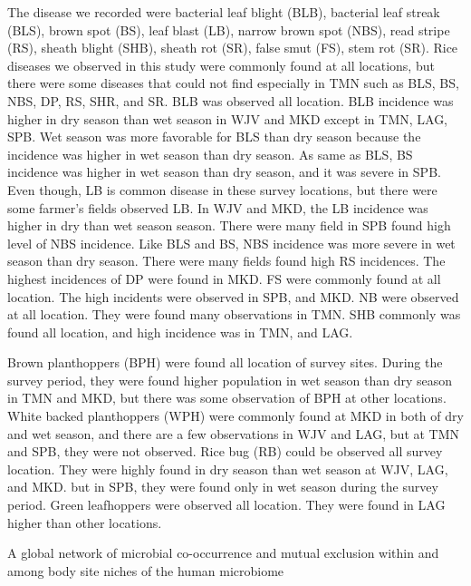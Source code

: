 The disease we recorded were bacterial leaf blight (BLB), bacterial leaf streak (BLS), brown spot (BS), leaf blast (LB), narrow brown spot (NBS), read stripe (RS), sheath blight (SHB), sheath rot (SR), false smut (FS), stem rot (SR). Rice diseases we observed in this study were commonly found at all locations, but there were some diseases that could not find especially in TMN such as BLS, BS, NBS, DP, RS, SHR, and SR. BLB was observed all location. BLB incidence was higher in dry season than wet season in WJV and MKD except in TMN, LAG, SPB. Wet season was more favorable for BLS than dry season because the incidence was higher in wet season than dry season. As same as BLS, BS incidence was higher in wet season than dry season, and it was severe in SPB. Even though, LB is common disease in these survey locations, but there were some farmer’s fields observed LB. In WJV and MKD, the LB incidence was higher in dry than wet season season. There were many field in SPB found high level of NBS incidence. Like BLS and BS, NBS incidence was more severe in wet season than dry season. There were many fields found high RS incidences. The highest incidences of DP were found in MKD. FS were commonly found at all location. The high incidents were observed in SPB, and MKD. NB were observed at all location. They were found many observations in TMN.  SHB commonly was found all location, and high incidence was in TMN, and LAG. 

Brown planthoppers (BPH) were found all location of survey sites. During the survey period, they were found higher population in wet season than dry season in TMN and MKD, but there was some observation of BPH at other locations. White backed planthoppers (WPH) were commonly found at MKD in both of dry and wet season, and there are a few observations in WJV and LAG, but at TMN and SPB, they were not observed. Rice bug (RB) could be observed all survey location. They were highly found in dry season than wet season at WJV, LAG, and MKD. but in SPB, they were found only in wet season during the survey period.  Green leafhoppers were observed all location. They were found in LAG higher than other locations.


A global network of microbial co-occurrence and mutual exclusion within and among body site niches of the human microbiome

